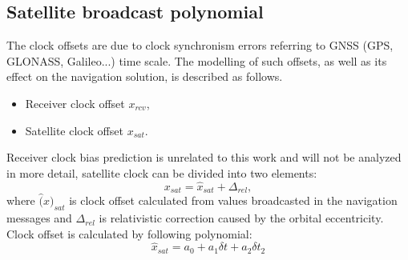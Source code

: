 \subsection{Satellite broadcast polynomial}
The clock offsets are due to clock synchronism errors referring to GNSS (GPS, GLONASS, Galileo...)
time scale. The modelling of such offsets, 
as well as its effect on the navigation solution, is described as follows.
\begin{itemize}
	\item Receiver clock offset $x_{rcv}$,
	\item Satellite clock offset $x_{sat}$. 
\end{itemize}
Receiver clock bias prediction is unrelated to this work and will not be analyzed in more detail,
satellite clock can be divided into two elements:
\begin{equation}
	\label{equ:sat_bias_comp}
	x_{sat} = \hat{x}_{sat} + \Delta_{rel},
\end{equation}
where $\hat(x)_{sat}$ is clock offset calculated from values broadcasted in the navigation 
messages and $\Delta_{rel}$ is relativistic correction caused by the orbital eccentricity.
Clock offset is calculated by following polynomial:
\begin{equation}
	\label{equ:brodcast_polynomial}
	\hat{x}_{sat} = a_{0} + a_{1}\delta t + a_{2}\delta t_{2}
\end{equation}

